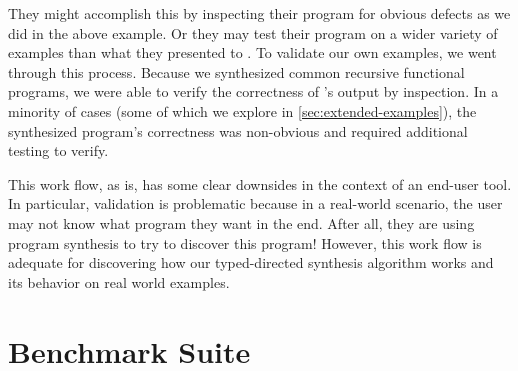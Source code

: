 They might accomplish this by inspecting their program for obvious defects as we did in the above example.
Or they may test their program on a wider variety of examples than what they presented to \myth{}.
To validate our own examples, we went through this process.
Because we synthesized common recursive functional programs, we were able to verify the correctness of \myth{}'s output by inspection.
In a minority of cases (some of which we explore in \autoref{sec:extended-examples}), the synthesized program's correctness was non-obvious and required additional testing to verify.

This work flow, as is, has some clear downsides in the context of an end-user tool.
In particular, validation is problematic because in a real-world scenario, the user may not know what program they want in the end.
After all, they are using program synthesis to try to discover this program!
However, this work flow is adequate for discovering how our typed-directed synthesis algorithm works and its behavior on real world examples.

\section{Benchmark Suite}
\label{sec:benchmark-suite}


